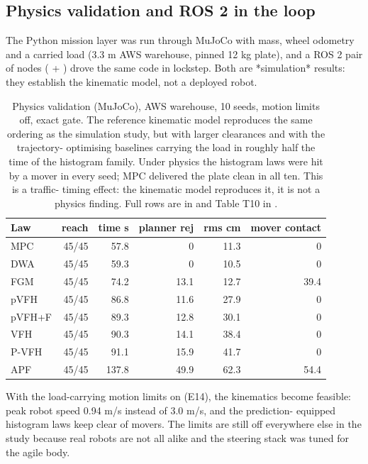\subsection{Physics validation and ROS 2 in the loop}
\label{sec:physics-ros2}

The Python mission layer was run through MuJoCo with mass, wheel odometry and
a carried load (3.3 m AWS warehouse, pinned 12 kg plate), and a ROS 2 pair of
nodes ( + ) drove the same
code in lockstep. Both are *simulation* results: they establish the kinematic
model, not a deployed robot.

\begin{table}[H]
\centering\footnotesize
\begin{tabular}{@{}lrrrrr@{}}
\toprule
\textbf{Law} & \textbf{reach} & \textbf{time s} & \textbf{planner rej} & \textbf{rms cm} & \textbf{mover contact}\\
\midrule
MPC & 45/45 & 57.8 & 0 & 11.3 & 0\\
DWA & 45/45 & 59.3 & 0 & 10.5 & 0\\
FGM & 45/45 & 74.2 & 13.1 & 12.7 & 39.4\\
pVFH & 45/45 & 86.8 & 11.6 & 27.9 & 0\\
pVFH+F & 45/45 & 89.3 & 12.8 & 30.1 & 0\\
VFH & 45/45 & 90.3 & 14.1 & 38.4 & 0\\
P-VFH & 45/45 & 91.1 & 15.9 & 41.7 & 0\\
APF & 45/45 & 137.8 & 49.9 & 62.3 & 54.4\\
\bottomrule
\end{tabular}
\caption{Physics validation (MuJoCo), AWS warehouse, 10 seeds, motion limits
off, exact gate. The reference kinematic model reproduces the same ordering
as the simulation study, but with larger clearances and with the trajectory-
optimising baselines carrying the load in roughly half the time of the
histogram family. Under physics the histogram laws were hit by a mover in
every seed; MPC delivered the plate clean in all ten. This is a traffic-
timing effect: the kinematic model reproduces it, it is not a physics
finding. Full rows are in  and Table
T10 in .}
\label{tab:physics}
\end{table}

With the load-carrying motion limits on (E14), the kinematics become
feasible: peak robot speed 0.94 m/s instead of 3.0 m/s, and the prediction-
equipped histogram laws keep clear of movers. The limits are still off
everywhere else in the study because real robots are not all alike and the
steering stack was tuned for the agile body.


